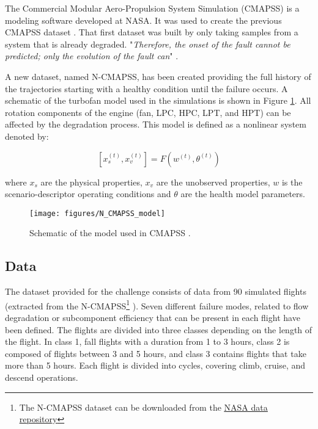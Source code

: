 \documentclass[PHM, 2021]{PHMSociety}
\begin{document}
The Commercial Modular Aero-Propulsion System Simulation (CMAPSS) is a modeling software developed at NASA. It was used to create the previous CMAPSS dataset \cite{saxena2008damage}. That first dataset was built by only taking samples from a system that is already degraded. "\emph{Therefore, the onset of the fault cannot be predicted; only the evolution of the fault can}" \cite{arias2021aircraft}. 

A new dataset, named N-CMAPSS, has been created providing the full history of the trajectories starting with a healthy condition until the failure occurs. A schematic of the turbofan model used in the simulations is shown in Figure \ref{fig:cmapss_model}. All rotation components of the engine (fan, LPC, HPC, LPT, and HPT) can be affected by the degradation process. This model is defined as a nonlinear system denoted by:

\begin{equation}
\left [x_s^{(t)}, x_v^{(t)} \right ] = F \left ( w^{(t)}, \theta^{(t)} \right )
\label{eq:cmapss_system}
\end{equation}

where $x_s$ are the physical properties, $x_v$ are the unobserved properties, $w$ is the scenario-descriptor operating conditions and $\theta$ are the health model parameters.

\begin{figure}[t]
\centering
\texttt{[image: figures/N\_CMAPSS\_model]}
\caption[Schematic of the model used in CMAPSS.]{Schematic of the model used in CMAPSS \cite{arias2021aircraft}.}
\label{fig:cmapss_model}
\end{figure}

\subsection{Data}

The dataset provided for the challenge consists of data from 90 simulated flights (extracted from the N-CMAPSS\footnote{The N-CMAPSS dataset can be downloaded from the \href{https://ti.arc.nasa.gov/tech/dash/groups/pcoe/prognostic-data-repository/\#turbofan-2}{\underline{NASA data repository}}} \cite{arias2021aircraft}). Seven different failure modes, related to flow degradation or subcomponent efficiency that can be present in each flight have been defined. The flights are divided into three classes depending on the length of the flight. In class 1, fall flights with a duration from 1 to 3 hours, class 2 is composed of flights between 3 and 5 hours, and class 3 contains flights that take more than 5 hours. Each flight is divided into cycles, covering climb, cruise, and descend operations.
\end{document}
